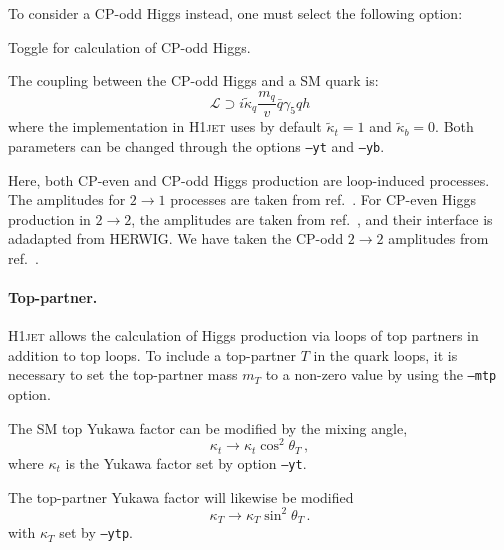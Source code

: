 \documentclass[12pt]{article}
\begin{document}
\noindent
To consider a CP-odd Higgs instead, one must select the following option: 
\begin{description}[labelindent=1cm, labelwidth =\widthof{\bfseries9999999999999999999999}, leftmargin = !] 
	\item[\texttt{--cpodd}] Toggle for calculation of CP-odd Higgs. 
\end{description}
The coupling between the CP-odd Higgs and a SM quark is: 
\begin{equation}
   \mathcal{L} \supset i \tilde{\kappa}_q \frac{m_q}{v} \bar{q} \gamma_5 q h
\end{equation}
where the implementation in \textsc{H1jet} uses by default $\tilde{\kappa}_t = 1$ and $\tilde{\kappa}_b = 0$. Both parameters can be changed through the options \texttt{--yt} and \texttt{--yb}.

Here, both CP-even and CP-odd Higgs production are loop-induced
processes. The amplitudes for $2\to 1$ processes are taken
from ref.~\cite{Spira:1995rr}. For CP-even Higgs production in $2\to 2$,
the amplitudes are taken from ref.~\cite{Baur:1989cm}, and their interface is adadapted from HERWIG. We have
taken the CP-odd $2\to 2$ amplitudes from ref.~\cite{Grojean:2013nya}.

\paragraph{Top-partner.} \textsc{H1jet} allows the calculation of
Higgs production via loops of top partners in addition to top loops.
To include a top-partner $T$ in the quark loops, it is necessary
to set the top-partner mass $m_T$ to a non-zero value by using the
\texttt{--mtp} option.

The SM top Yukawa factor can be modified by the mixing angle, 
\begin{equation}
   \kappa_t \rightarrow \kappa_t \cos^2\theta_T \,, 
\end{equation} 
where $\kappa_t$ is the Yukawa factor set by option \texttt{--yt}. 

The top-partner Yukawa factor will likewise be modified 
\begin{equation}
   \kappa_T \rightarrow \kappa_T \sin^2\theta_T \,. 
\end{equation} 
with $\kappa_T$ set by \texttt{--ytp}.
\end{document}

